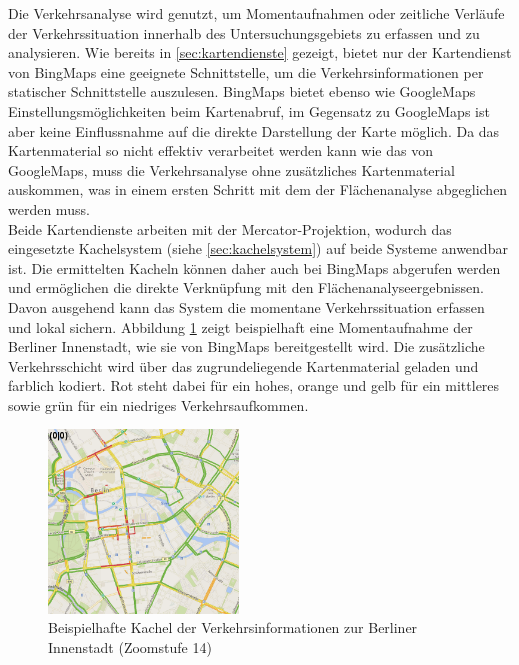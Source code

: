 Die Verkehrsanalyse wird genutzt, um Momentaufnahmen oder zeitliche Verläufe der Verkehrssituation innerhalb des Untersuchungsgebiets zu erfassen und zu analysieren. Wie bereits in \ref{sec:kartendienste} gezeigt, bietet nur der Kartendienst von BingMaps eine geeignete Schnittstelle, um die Verkehrsinformationen per statischer Schnittstelle auszulesen. BingMaps bietet ebenso wie GoogleMaps Einstellungsmöglichkeiten beim Kartenabruf, im Gegensatz zu GoogleMaps ist aber keine Einflussnahme auf die direkte Darstellung der Karte möglich. Da das Kartenmaterial so nicht effektiv verarbeitet werden kann wie das von GoogleMaps, muss die Verkehrsanalyse ohne zusätzliches Kartenmaterial auskommen, was in einem ersten Schritt mit dem der Flächenanalyse abgeglichen werden muss.\\

Beide Kartendienste arbeiten mit der Mercator-Projektion, wodurch das eingesetzte Kachelsystem (siehe \ref{sec:kachelsystem}) auf beide Systeme anwendbar ist. Die ermittelten Kacheln können daher auch bei BingMaps abgerufen werden und ermöglichen die direkte Verknüpfung mit den Flächenanalyseergebnissen. Davon ausgehend kann das System die momentane Verkehrssituation erfassen und lokal sichern. Abbildung \ref{fig:berlin_traffic} zeigt beispielhaft eine Momentaufnahme der Berliner Innenstadt, wie sie von BingMaps bereitgestellt wird. Die zusätzliche Verkehrsschicht wird über das zugrundeliegende Kartenmaterial geladen und farblich kodiert. Rot steht dabei für ein hohes, orange und gelb für ein mittleres sowie grün für ein niedriges Verkehrsaufkommen.\\

\begin{figure}
  \centering
    \includegraphics[width=0.45\textwidth]{images/traffic_berlin.png}
    \caption{Beispielhafte Kachel der Verkehrsinformationen zur Berliner Innenstadt (Zoomstufe 14)}
    \label{fig:berlin_traffic}
\end{figure}

